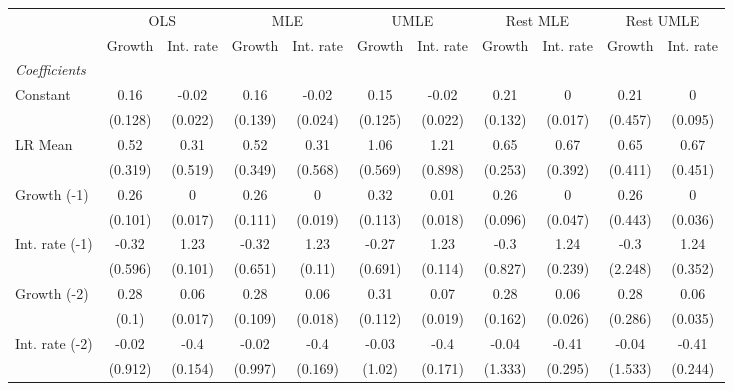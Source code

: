 \begin{table}[htbp] 
	\centering
	\begin{tabular}{@{\extracolsep{4pt}}lcccccccccc@{}}		\hline\hline
		 		 & \multicolumn{2}{c}{OLS} &\multicolumn{2}{c}{MLE} &\multicolumn{2}{c}{UMLE} &\multicolumn{2}{c}{Rest MLE} &\multicolumn{2}{c}{Rest UMLE} \\ 
 		 & Growth 	 & Int. rate 	 & Growth 	 & Int. rate 	 & Growth 	 & Int. rate 	 & Growth 	 & Int. rate 	 & Growth 	 & Int. rate\\\cline{2-3}\cline{4-5}\cline{6-7}\cline{8-9}\cline{10-11}
\rule{0pt}{4ex} 
 \emph{Coefficients} 	  		 & 		 & 		 & 		 & 		 & 		 & 		 & 		 & 		 & 		 &\\ 
\quad Constant 	 & 0.16 	 & -0.02 	 & 0.16 	 & -0.02 	 & 0.15 	 & -0.02 	 & 0.21 	 & 0 	 & 0.21 	 & 0	 \\ 
 		 & (0.128) 	 & (0.022) 	 & (0.139) 	 & (0.024) 	 & (0.125) 	 & (0.022) 	 & (0.132) 	 & (0.017) 	 & (0.457) 	 & (0.095) 	 \\ 
\quad LR Mean 	 & 0.52 	 & 0.31 	 & 0.52 	 & 0.31 	 & 1.06 	 & 1.21 	 & 0.65 	 & 0.67 	 & 0.65 	 & 0.67	 \\ 
 		 & (0.319) 	 & (0.519) 	 & (0.349) 	 & (0.568) 	 & (0.569) 	 & (0.898) 	 & (0.253) 	 & (0.392) 	 & (0.411) 	 & (0.451) 	 \\ 
\quad Growth (-1) 	 &0.26 	 & 0 	 & 0.26 	 & 0 	 & 0.32 	 & 0.01 	 & 0.26 	 & 0 	 & 0.26 	 & 0	 \\ 
 		 & (0.101) 	 & (0.017) 	 & (0.111) 	 & (0.019) 	 & (0.113) 	 & (0.018) 	 & (0.096) 	 & (0.047) 	 & (0.443) 	 & (0.036) 	 \\ 
\quad Int. rate (-1) 	 &-0.32 	 & 1.23 	 & -0.32 	 & 1.23 	 & -0.27 	 & 1.23 	 & -0.3 	 & 1.24 	 & -0.3 	 & 1.24	 \\ 
 		 & (0.596) 	 & (0.101) 	 & (0.651) 	 & (0.11) 	 & (0.691) 	 & (0.114) 	 & (0.827) 	 & (0.239) 	 & (2.248) 	 & (0.352) 	 \\ 
\quad Growth (-2) 	 &0.28 	 & 0.06 	 & 0.28 	 & 0.06 	 & 0.31 	 & 0.07 	 & 0.28 	 & 0.06 	 & 0.28 	 & 0.06	 \\ 
 		 & (0.1) 	 & (0.017) 	 & (0.109) 	 & (0.018) 	 & (0.112) 	 & (0.019) 	 & (0.162) 	 & (0.026) 	 & (0.286) 	 & (0.035) 	 \\ 
\quad Int. rate (-2) 	 &-0.02 	 & -0.4 	 & -0.02 	 & -0.4 	 & -0.03 	 & -0.4 	 & -0.04 	 & -0.41 	 & -0.04 	 & -0.41	 \\ 
 		 & (0.912) 	 & (0.154) 	 & (0.997) 	 & (0.169) 	 & (1.02) 	 & (0.171) 	 & (1.333) 	 & (0.295) 	 & (1.533) 	 & (0.244) 	 \\ 

\end{tabular}
\end{table}
